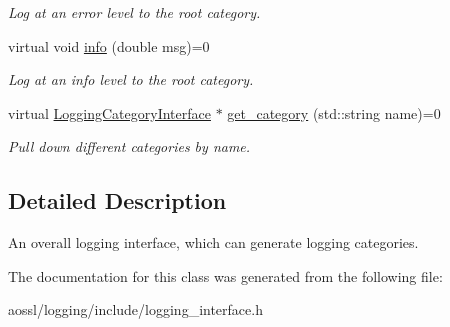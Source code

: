 \begin{DoxyCompactItemize}
\begin{DoxyCompactList}\small\item\em Log at an error level to the root category. \end{DoxyCompactList}\item 
virtual void \hyperlink{classLoggingInterface_a6e196d311e2b078071a3a4a8337a6264}{info} (double msg)=0\hypertarget{classLoggingInterface_a6e196d311e2b078071a3a4a8337a6264}{}\label{classLoggingInterface_a6e196d311e2b078071a3a4a8337a6264}

\begin{DoxyCompactList}\small\item\em Log at an info level to the root category. \end{DoxyCompactList}\item 
virtual \hyperlink{classLoggingCategoryInterface}{Logging\+Category\+Interface} $\ast$ \hyperlink{classLoggingInterface_add380ece858220c46aeb38ce1531a6c7}{get\+\_\+category} (std\+::string name)=0\hypertarget{classLoggingInterface_add380ece858220c46aeb38ce1531a6c7}{}\label{classLoggingInterface_add380ece858220c46aeb38ce1531a6c7}

\begin{DoxyCompactList}\small\item\em Pull down different categories by name. \end{DoxyCompactList}\end{DoxyCompactItemize}


\subsection{Detailed Description}
An overall logging interface, which can generate logging categories. 

The documentation for this class was generated from the following file\+:\begin{DoxyCompactItemize}
\item 
aossl/logging/include/logging\+\_\+interface.\+h\end{DoxyCompactItemize}
